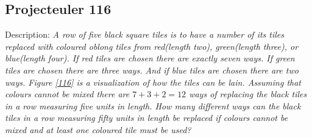 \documentclass[a4paper, 11pt, titlepage]{article}
\begin{document}
\begin{figure}[H]
	\centering
	\caption{}
	\label{graph112}
\end{figure}
\begin{figure}[H]
	\centering
	\caption{}
	\label{graph113}
\end{figure}

\subsection{Projecteuler 116}
Description: \textit{A row of five black square tiles is to have a number of its tiles replaced with coloured oblong tiles from red(length two), green(length three), or blue(length four). If red tiles are chosen there are exactly seven ways. If green tiles are chosen there are three ways. And if blue tiles are chosen there are two ways. Figure \ref{116} is a visualization of how the tiles can be lain. Assuming that colours cannot be mixed there are $7+3+2=12$ ways of replacing the black tiles in a row measuring five units in length. How many different ways can the black tiles in a row measuring fifty units in length be replaced if colours cannot be mixed and at least one coloured tile must be used?}
\end{document}
